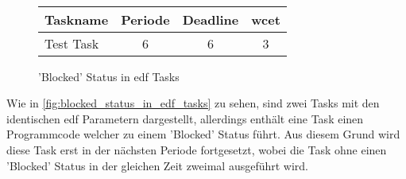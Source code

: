 \documentclass[../EDF Master Thesis.tex]{subfiles}
\begin{document}
\begin{figure}[H]
\\

        \vspace {0.5cm}
        \begin{tabular}{l|c|c|c}
            Taskname & Periode & Deadline & \ac{wcet} \\
            \hline
            Test Task & 6 & 6 & 3 \\
        \end{tabular}
        \caption{'Blocked' Status in \ac{edf} Tasks}
        \label{fig:blocked_status_in_edf_tasks}
    \end{figure}

    Wie in \autoref{fig:blocked_status_in_edf_tasks} zu sehen, sind zwei Tasks mit den identischen \ac{edf} Parametern dargestellt, allerdings enthält eine Task einen Programmcode welcher zu einem 'Blocked' Status führt.
    Aus diesem Grund wird diese Task erst in der nächsten Periode fortgesetzt, wobei die Task ohne einen 'Blocked' Status in der gleichen Zeit zweimal ausgeführt wird.
\end{document}
